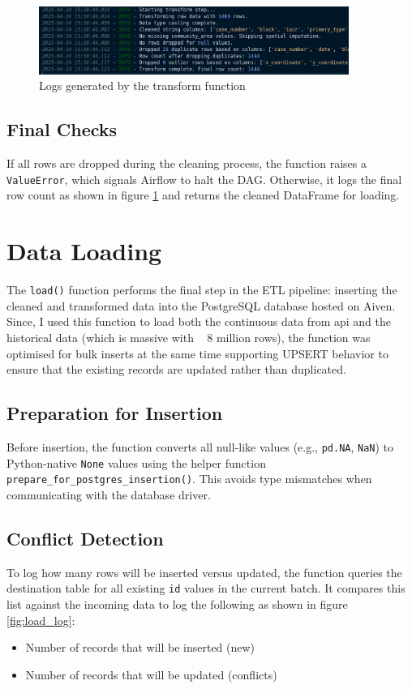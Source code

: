 \documentclass[12pt]{article}
\begin{document}
\begin{figure}[h!]
    \centering
    \includegraphics[width=0.9\textwidth]{figures/transform_logs.png}
    \caption{Logs generated by the transform function}
    \label{fig:transform_logs}
\end{figure}


\subsection*{Final Checks}
If all rows are dropped during the cleaning process, the function raises a \texttt{ValueError}, which signals Airflow to halt the DAG. Otherwise, it logs the final row count as shown in figure \ref{fig:transform_logs} and returns the cleaned DataFrame for loading.




\section{Data Loading}

The \texttt{load()} function performs the final step in the ETL pipeline: inserting the cleaned and transformed data into the PostgreSQL database hosted on Aiven. Since, I used this function to load both the continuous data from api and the historical data (which is massive with ~ 8 million rows), the function was optimised for bulk inserts at the same time supporting UPSERT behavior to ensure that the existing records are updated rather than duplicated.

\subsection*{Preparation for Insertion}
Before insertion, the function converts all null-like values (e.g., \texttt{pd.NA}, \texttt{NaN}) to Python-native \texttt{None} values using the helper function \texttt{prepare\_for\_postgres\_insertion()}. This avoids type mismatches when communicating with the database driver.

\subsection*{Conflict Detection}
To log how many rows will be inserted versus updated, the function queries the destination table for all existing \texttt{id} values in the current batch. It compares this list against the incoming data to log the following as shown in figure \ref{fig:load_log}:
\begin{itemize}
    \item Number of records that will be inserted (new)
    \item Number of records that will be updated (conflicts)
\end{itemize}
\end{document}
